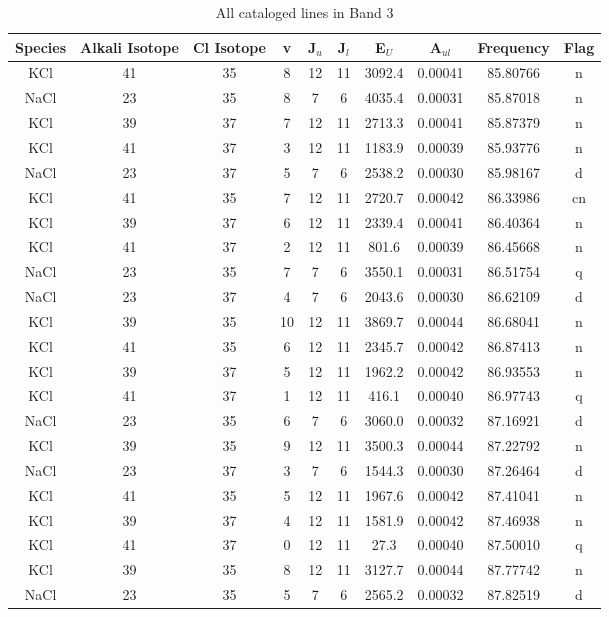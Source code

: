 \begin{table*}[htp]
\centering
\caption{All cataloged lines in Band 3}
\begin{tabular}{cccccccccc}
\label{tab:all_detections_B3}
Species & Alkali Isotope & Cl Isotope & v & J$_u$ & J$_l$ & E$_U$ & A$_{ul}$ & Frequency & Flag \\
\hline
KCl & 41 & 35 & 8 & 12 & 11 & 3092.4 & 0.00041 & 85.80766 & n \\
NaCl & 23 & 35 & 8 & 7 & 6 & 4035.4 & 0.00031 & 85.87018 & n \\
KCl & 39 & 37 & 7 & 12 & 11 & 2713.3 & 0.00041 & 85.87379 & n \\
KCl & 41 & 37 & 3 & 12 & 11 & 1183.9 & 0.00039 & 85.93776 & n \\
NaCl & 23 & 37 & 5 & 7 & 6 & 2538.2 & 0.00030 & 85.98167 & d \\
KCl & 41 & 35 & 7 & 12 & 11 & 2720.7 & 0.00042 & 86.33986 & cn \\
KCl & 39 & 37 & 6 & 12 & 11 & 2339.4 & 0.00041 & 86.40364 & n \\
KCl & 41 & 37 & 2 & 12 & 11 & 801.6 & 0.00039 & 86.45668 & n \\
NaCl & 23 & 35 & 7 & 7 & 6 & 3550.1 & 0.00031 & 86.51754 & q \\
NaCl & 23 & 37 & 4 & 7 & 6 & 2043.6 & 0.00030 & 86.62109 & d \\
KCl & 39 & 35 & 10 & 12 & 11 & 3869.7 & 0.00044 & 86.68041 & n \\
KCl & 41 & 35 & 6 & 12 & 11 & 2345.7 & 0.00042 & 86.87413 & n \\
KCl & 39 & 37 & 5 & 12 & 11 & 1962.2 & 0.00042 & 86.93553 & n \\
KCl & 41 & 37 & 1 & 12 & 11 & 416.1 & 0.00040 & 86.97743 & q \\
NaCl & 23 & 35 & 6 & 7 & 6 & 3060.0 & 0.00032 & 87.16921 & d \\
KCl & 39 & 35 & 9 & 12 & 11 & 3500.3 & 0.00044 & 87.22792 & n \\
NaCl & 23 & 37 & 3 & 7 & 6 & 1544.3 & 0.00030 & 87.26464 & d \\
KCl & 41 & 35 & 5 & 12 & 11 & 1967.6 & 0.00042 & 87.41041 & n \\
KCl & 39 & 37 & 4 & 12 & 11 & 1581.9 & 0.00042 & 87.46938 & n \\
KCl & 41 & 37 & 0 & 12 & 11 & 27.3 & 0.00040 & 87.50010 & q \\
KCl & 39 & 35 & 8 & 12 & 11 & 3127.7 & 0.00044 & 87.77742 & n \\
NaCl & 23 & 35 & 5 & 7 & 6 & 2565.2 & 0.00032 & 87.82519 & d \\

\end{tabular}
\end{table*}
